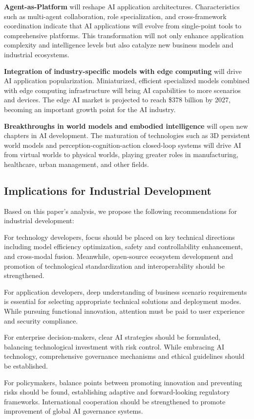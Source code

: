 \documentclass{article}
\begin{document}
\textbf{Agent-as-Platform} will reshape AI application architectures. Characteristics such as multi-agent collaboration, role specialization, and cross-framework coordination indicate that AI applications will evolve from single-point tools to comprehensive platforms. This transformation will not only enhance application complexity and intelligence levels but also catalyze new business models and industrial ecosystems.

\textbf{Integration of industry-specific models with edge computing} will drive AI application popularization. Miniaturized, efficient specialized models combined with edge computing infrastructure will bring AI capabilities to more scenarios and devices. The edge AI market is projected to reach \$378 billion by 2027, becoming an important growth point for the AI industry.

\textbf{Breakthroughs in world models and embodied intelligence} will open new chapters in AI development. The maturation of technologies such as 3D persistent world models and perception-cognition-action closed-loop systems will drive AI from virtual worlds to physical worlds, playing greater roles in manufacturing, healthcare, urban management, and other fields.

\subsection{Implications for Industrial Development}
Based on this paper's analysis, we propose the following recommendations for industrial development:

For technology developers, focus should be placed on key technical directions including model efficiency optimization, safety and controllability enhancement, and cross-modal fusion. Meanwhile, open-source ecosystem development and promotion of technological standardization and interoperability should be strengthened.

For application developers, deep understanding of business scenario requirements is essential for selecting appropriate technical solutions and deployment modes. While pursuing functional innovation, attention must be paid to user experience and security compliance.

For enterprise decision-makers, clear AI strategies should be formulated, balancing technological investment with risk control. While embracing AI technology, comprehensive governance mechanisms and ethical guidelines should be established.

For policymakers, balance points between promoting innovation and preventing risks should be found, establishing adaptive and forward-looking regulatory frameworks. International cooperation should be strengthened to promote improvement of global AI governance systems.
\end{document}
